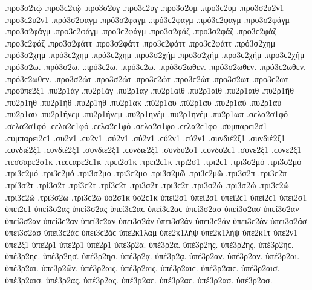 {.προ3σ2τῴ .προ3ϲ2τῴ
.προ3σ2υγ .προ3ϲ2υγ   %
.προ3σ2υμ .προ3ϲ2υμ   %
.προ3σ2υ2ν1 .προ3ϲ2υ2ν1   %
.πρό3σ2φαγμ .πρό3σ2φαγμ .πρό3ϲ2φαγμ .πρό3ϲ2φαγμ   %
.προ3σ2φάγμ .προ3σ2φάγμ .προ3ϲ2φάγμ .προ3ϲ2φάγμ
.προ3σ2φάζ .προ3σ2φάζ .προ3ϲ2φάζ .προ3ϲ2φάζ   %
.προ3σ2φάττ .προ3σ2φάττ .προ3ϲ2φάττ .προ3ϲ2φάττ   %
.πρό3σ2χημ .πρό3σ2χημ .πρό3ϲ2χημ .πρό3ϲ2χημ   %
.προ3σ2χήμ .προ3σ2χήμ .προ3ϲ2χήμ .προ3ϲ2χήμ
.πρό3σ2ω. .πρό3σ2ω. .πρό3ϲ2ω. .πρό3ϲ2ω.
.πρό3σ2ωθεν. .πρό3σ2ωθεν. .πρό3ϲ2ωθεν. .πρό3ϲ2ωθεν.
.προ3σ2ώτ .προ3σ2ώτ .προ3ϲ2ώτ .προ3ϲ2ώτ   %
.προ3σ2ωτ .προ3ϲ2ωτ
.προϋπε2ξ1   %
.πυ2ρ1άγ .πυ2ρ1άγ   %
.πυ2ρ1αγ
.πυ2ρ1αίθ .πυ2ρ1αίθ   %
.πυ2ρ1αιθ   %
.πυ2ρ1ῆθ   %
.πυ2ρ1ηθ   %
.πυ2ρ1ήθ .πυ2ρ1ήθ   %
.πυ2ρ1ακ   %
.πύ2ρ1αυ .πύ2ρ1αυ   %
.πυ2ρ1αύ .πυ2ρ1αύ
.πυ2ρ1αυ   %
.πυ2ρ1ήνεμ .πυ2ρ1ήνεμ   %
.πυ2ρ1ηνέμ .πυ2ρ1ηνέμ
.πυ2ρ1ωπ   %
.σελα2σ1φό .σελα2σ1φό .ϲελα2ϲ1φό .ϲελα2ϲ1φό   %
.σελα2σ1φο .ϲελα2ϲ1φο
.συμπαρει2σ1 .ϲυμπαρει2ϲ1   %
.συ2ν1 .ϲυ2ν1
.σύ2ν1 .σύ2ν1 .ϲύ2ν1 .ϲύ2ν1   %
.συνδιέ2ξ1 .συνδιέ2ξ1 .ϲυνδιέ2ξ1 .ϲυνδιέ2ξ1   %
.συνδιε2ξ1 .ϲυνδιε2ξ1   %
.συνδυ2σ1 .ϲυνδυ2ϲ1   %
.συνε2ξ1 .ϲυνε2ξ1   %
.τεσσαρε2σ1κ .τεϲϲαρε2ϲ1κ   %
.τρει2σ1κ .τρει2ϲ1κ   %
.τρι2σ1 .τρι2ϲ1
.τρι3σ2μό .τρι3σ2μό .τρι3ϲ2μό .τρι3ϲ2μό   %
.τρι3σ2μο .τρι3ϲ2μο
.τρι3σ2μῶ .τρι3ϲ2μῶ
.τρι3σ2π .τρι3ϲ2π   %
.τρί3σ2τ .τρί3σ2τ .τρί3ϲ2τ .τρί3ϲ2τ   %
.τρι3σ2τ .τρι3ϲ2τ
.τρι3σ2ώ .τρι3σ2ώ .τρι3ϲ2ώ .τρι3ϲ2ώ   %
.τρι3σ2ω .τρι3ϲ2ω
ὑο2σ1κ ὑο2ϲ1κ   %
ὑπεί2σ1 ὑπεί2σ1 ὑπεί2ϲ1 ὑπεί2ϲ1
ὑπει2σ1 ὑπει2ϲ1
ὑπεί3σ2ας ὑπεί3σ2ας ὑπεί3ϲ2αϲ ὑπεί3ϲ2αϲ   %
ὑπεί3σ2ασ ὑπεί3σ2ασ
ὑπεί3σ2αν ὑπεί3σ2αν ὑπεί3ϲ2αν ὑπεί3ϲ2αν
ὑπει3σ2άν ὑπει3σ2άν ὑπει3ϲ2άν ὑπει3ϲ2άν
ὑπει3σ2άσ ὑπει3σ2άσ ὑπει3ϲ2άϲ ὑπει3ϲ2άϲ
ὑπε2κ1λαμ   %
ὑπε2κ1λήψ ὑπε2κ1λήψ   %
ὑπε2κ1τ   %
ὑπε2ν1
ὑπε2ξ1
ὑπε2ρ1
ὑπέ2ρ1 ὑπέ2ρ1
ὑπέ3ρ2α. ὑπέ3ρ2α.   %
ὑπέ3ρ2ης. ὑπέ3ρ2ης. ὑπέ3ρ2ηϲ. ὑπέ3ρ2ηϲ.
ὑπέ3ρ2ησ. ὑπέ3ρ2ησ.
ὑπέ3ρ2ᾳ. ὑπέ3ρ2ᾳ.
ὑπέ3ρ2αν. ὑπέ3ρ2αν.
ὑπέ3ρ2αι. ὑπέ3ρ2αι.
ὑπε3ρ2ῶν.
ὑπέ3ρ2αις. ὑπέ3ρ2αις. ὑπέ3ρ2αιϲ. ὑπέ3ρ2αιϲ.
ὑπέ3ρ2αισ. ὑπέ3ρ2αισ.
ὑπέ3ρ2ας. ὑπέ3ρ2ας. ὑπέ3ρ2αϲ. ὑπέ3ρ2αϲ.
ὑπέ3ρ2ασ. ὑπέ3ρ2ασ.
}
